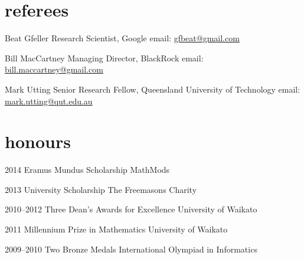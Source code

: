 \documentclass[]{boris-cv}
\begin{document}

\section{referees}

  {Beat Gfeller}
  {Research Scientist, Google}
  {email: \href{mailto:gfbeat@gmail.com}{gfbeat@gmail.com}}

  {Bill MacCartney}
  {Managing Director, BlackRock}
  {email: \href{mailto:bill.maccartney@gmail.com}{bill.maccartney@gmail.com}}


% 

  {Mark Utting}
  {Senior Research Fellow, Queensland University of Technology}
  {email: \href{mailto:mark.utting@qut.edu.au}{mark.utting@qut.edu.au}}

\section{honours}
\begin{entrylist}
  \titleentry
    {2014}
    {Eramus Mundus Scholarship}
    {MathMods}

  \titleentry
    {2013}
    {University Scholarship}
    {The Freemasons Charity}

  \titleentry
    {2010--2012}
    {Three Dean's Awards for Excellence}
    {University of Waikato}

  \titleentry
    {2011}
    {Millennium Prize in Mathematics}
    {University of Waikato}


  \titleentry
    {2009--2010}
    {Two Bronze Medals}
    {International Olympiad in Informatics}
\end{entrylist}
\end{document}
